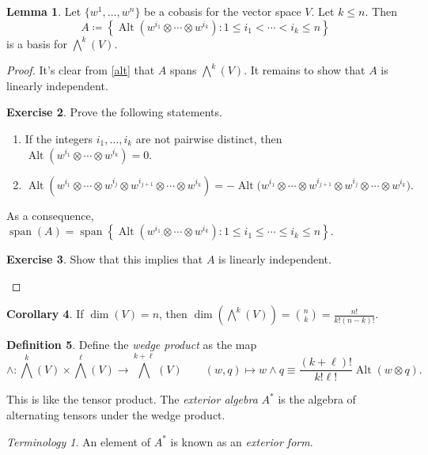 \documentclass[10pt,letterpaper,cm]{nupset}
\theoremstyle{definition}
\newtheorem{definition}{Definition}[subsection]
\theoremstyle{theorem}
\newtheorem{lemma}[definition]{Lemma}
\newtheorem{corollary}[definition]{Corollary}
\newtheorem{exercise}[definition]{Exercise}
\theoremstyle{remark}
\newtheorem*{term}{Terminology}
\newcommand{\1}{\mathbf{1}}
\newcommand{\0}{\vec 0}
\DeclareMathOperator*{\Span}{span}
\DeclareMathOperator{\Alt}{Alt}
\begin{document}
\begin{lemma}\label{bass}
Let $\{w^1, \ldots, w^n\}$ be a cobasis for the vector space $V$. Let $k\leq n$. Then $$A\coloneqq   \left\{\Alt(w^{i_1} \otimes \cdots \otimes w^{i_k}) : 1 \leq i_1 < \cdots < i_k \leq n \right\} $$ is a basis for $\bigwedge^k(V)$.
\end{lemma}
\begin{proof}
It's clear from \cref{alt} that $A$ spans $\bigwedge^k(V)$. It remains to show that $A$ is linearly independent. 
\begin{exercise} Prove the following statements. 
\begin{enumerate}
\item If the integers $i_1, \ldots, i_k$ are not pairwise distinct, then $\Alt(w^{i_1} \otimes \cdots \otimes w^{i_k}) = 0$.
\item $\Alt(w^{i_1} \otimes \cdots \otimes w^{i_j} \otimes w^{i_{j+1}} \otimes \cdots \otimes w^{i_k}) = {-\Alt(w^{i_1}} \otimes \cdots \otimes w^{i_{j+1}} \otimes w^{i_{j}} \otimes \cdots \otimes w^{i_k}).$
\end{enumerate}
\end{exercise}

As a consequence, $\Span(A) = \Span{\left\{\Alt(w^{i_1} \otimes \cdots \otimes w^{i_k}) : 1 \leq i_1 \leq \cdots \leq i_k \leq n\right \}}$.

\begin{exercise}
Show that this implies that $A$ is linearly independent.
\end{exercise}
\end{proof}

\begin{corollary}
If $\dim(V) = n$, then $\dim\left(\bigwedge^k(V)\right) = {n\choose k} = \frac{n!}{k!(n-k)!}$.
\end{corollary}

\begin{definition}\label{WP}
Define the \textit{wedge product} as the map $$\wedge : \bigwedge^k(V) \times \bigwedge^{\ell}(V) \to \bigwedge^{k+\ell}(V) \quad \quad (w, q) \mapsto w \wedge q \equiv  \frac{(k+\ell)!}{k! \ell!}\Alt(w\otimes q).$$  
\end{definition}

This is like the tensor product. The \textit{exterior algebra} $A^{\ast}$ is the algebra of alternating tensors under the wedge product.

\begin{term}
An element of $A^{\ast}$ is known as an \textit{exterior form}.
\end{term}
\end{document}
